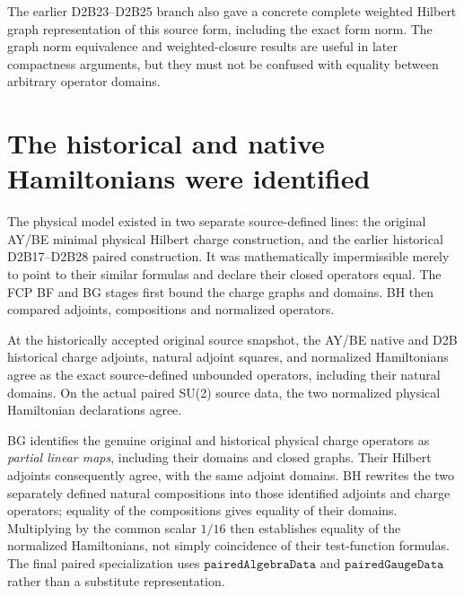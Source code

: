 The earlier D2B23--D2B25 branch also gave a concrete complete weighted
Hilbert graph representation of this source form, including the exact
form norm. The graph norm equivalence and weighted-closure results are
useful in later compactness arguments, but they must not be confused
with equality between arbitrary operator domains.

\section{The historical and native Hamiltonians were identified}
The physical model existed in two separate source-defined lines: the
original AY/BE minimal physical Hilbert charge construction, and the
earlier historical D2B17--D2B28 paired construction. It was
mathematically impermissible merely to point to their similar formulas
and declare their closed operators equal. The FCP BF and BG stages first
bound the charge graphs and domains. BH then compared adjoints,
compositions and normalized operators.

\begin{sourceaccount}\label{thm:BH}
At the historically accepted original source snapshot, the AY/BE native
and D2B historical charge adjoints, natural adjoint squares, and
normalized Hamiltonians agree as the exact source-defined unbounded
operators, including their natural domains. On the actual paired SU(2)
source data, the two normalized physical Hamiltonian declarations agree.
\end{sourceaccount}
\begin{sourceexplanation}
BG identifies the genuine original and historical physical charge
operators as \emph{partial linear maps}, including their domains and
closed graphs. Their Hilbert adjoints consequently agree, with the
same adjoint domains. BH rewrites the two separately defined
natural compositions into those identified adjoints and charge
operators; equality of the compositions gives equality of their
domains. Multiplying by the common scalar $1/16$ then establishes
equality of the normalized Hamiltonians, not simply coincidence of
their test-function formulas. The final paired specialization uses
$\texttt{pairedAlgebraData}$ and $\texttt{pairedGaugeData}$ rather than
a substitute representation.
\end{sourceexplanation}


